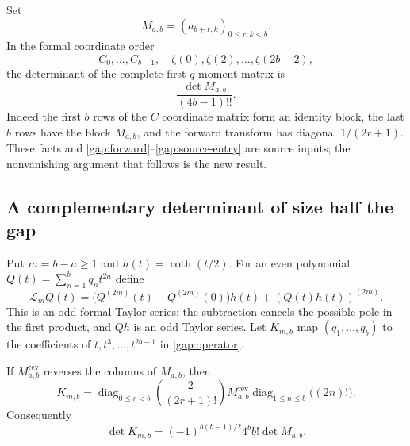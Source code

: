 Set
\begin{equation}\label{gap:late-matrix}
 M_{a,b}=(a_{b+r,k})_{0\le r,k<b}.
\end{equation}
In the formal coordinate order
\[
 C_0,\ldots,C_{b-1},\quad\zeta(0),\zeta(2),\ldots,\zeta(2b-2),
\]
the determinant of the complete first-$q$ moment matrix is
\begin{equation}\label{gap:full-prefix-determinant}
 \frac{\det M_{a,b}}{(4b-1)!!}.
\end{equation}
Indeed the first $b$ rows of the $C$ coordinate matrix form an
identity block, the last $b$ rows have the block $M_{a,b}$, and
the forward transform has diagonal $1/(2r+1)$. These facts and
\eqref{gap:forward}--\eqref{gap:source-entry} are source inputs;
the nonvanishing argument that follows is the new result.

\subsection{A complementary determinant of size half the gap}

Put $m=b-a\ge1$ and $h(t)=\coth(t/2)$. For an even polynomial
$Q(t)=\sum_{n=1}^b q_nt^{2n}$ define
\begin{equation}\label{gap:operator}
 \mathcal L_mQ(t)
 =\bigl(Q^{(2m)}(t)-Q^{(2m)}(0)\bigr)h(t)
                      +(Q(t)h(t))^{(2m)}.
\end{equation}
This is an odd formal Taylor series: the subtraction cancels the
possible pole in the first product, and $Qh$ is an odd Taylor series.
Let $K_{m,b}$ map $(q_1,\ldots,q_b)$ to the coefficients of
$t,t^3,\ldots,t^{2b-1}$ in \eqref{gap:operator}.

\begin{lemma}\label{gap:conjugacy}
If $M_{a,b}^{\mathrm{rev}}$ reverses the columns of $M_{a,b}$, then
\begin{equation}\label{gap:conjugacy-equation}
 K_{m,b}=
 \operatorname{diag}_{0\le r<b}\!\left(\frac2{(2r+1)!}\right)
 M_{a,b}^{\mathrm{rev}}
 \operatorname{diag}_{1\le n\le b}\!\bigl((2n)!\bigr).
\end{equation}
Consequently
\begin{equation}\label{gap:conjugacy-determinant}
 \det K_{m,b}=(-1)^{b(b-1)/2}4^bb!\det M_{a,b}.
\end{equation}
\end{lemma}

